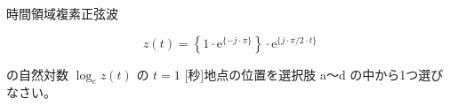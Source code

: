 時間領域複素正弦波 

\[
z(t) =  \left \{ 1 \cdot \textrm{e}^{\{ -j \cdot \pi \}} \right \} \cdot \textrm{e}^{\{ j \cdot \pi/2 \cdot t \}}
\]

\bigskip の自然対数 $\log_e z(t)$ の $t = 1$ [秒]地点の位置を選択肢 a〜d の中から1つ選びなさい。
